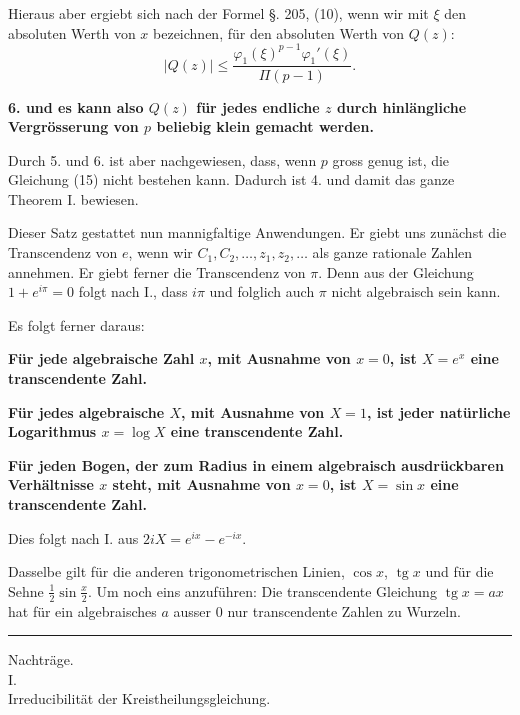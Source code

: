 \documentclass[11pt]{article}
\newcommand{\abs}[1]{\left|#1\right|}
\newcommand{\tg}{\operatorname{tg}}
\begin{document}
Hieraus aber ergiebt sich nach der Formel §. 205, (10), wenn wir mit $\xi$ den absoluten Werth von $x$ bezeichnen, für den absoluten Werth von $Q(z)$:
\[
\abs{Q(z)}\leq \frac{\varphi_1(\xi)^{p-1}\varphi_1'(\xi)}{\Pi(p-1)}.
\]

\textbf{6. und es kann also $Q(z)$ für jedes endliche $z$ durch hinlängliche Vergrösserung von $p$ beliebig klein gemacht werden.}

Durch 5. und 6. ist aber nachgewiesen, dass, wenn $p$ gross genug ist, die Gleichung (15) nicht bestehen kann. Dadurch ist 4. und damit das ganze Theorem I. bewiesen.

Dieser Satz gestattet nun mannigfaltige Anwendungen. Er giebt uns zunächst die Transcendenz von $e$, wenn wir $C_1,C_2,\ldots,z_1,z_2,\ldots$ als ganze rationale Zahlen annehmen. Er giebt ferner die Transcendenz von $\pi$. Denn aus der Gleichung $1+e^{i\pi}=0$ folgt nach I., dass $i\pi$ und folglich auch $\pi$ nicht algebraisch sein kann.

Es folgt ferner daraus:

\begin{center}
\textbf{Für jede algebraische Zahl $x$, mit Ausnahme von $x=0$, ist $X=e^x$ eine transcendente Zahl.}

\textbf{Für jedes algebraische $X$, mit Ausnahme von $X=1$, ist jeder natürliche Logarithmus $x=\log X$ eine transcendente Zahl.}

\textbf{Für jeden Bogen, der zum Radius in einem algebraisch ausdrückbaren Verhältnisse $x$ steht, mit Ausnahme von $x=0$, ist $X=\sin x$ eine transcendente Zahl.}
\end{center}

Dies folgt nach I. aus $2iX=e^{ix}-e^{-ix}$.

Dasselbe gilt für die anderen trigonometrischen Linien, $\cos x$, $\tg x$ und für die Sehne $\frac12\sin\frac{x}{2}$. Um noch eins anzuführen: Die transcendente Gleichung $\tg x=ax$ hat für ein algebraisches $a$ ausser 0 nur transcendente Zahlen zu Wurzeln.

\bigskip
\begin{center}\rule{0.28\linewidth}{0.4pt}\end{center}

\clearpage
\begin{center}
{\Large Nachträge.}\\[1em]
{\large I.}\\[0.5em]
{\large Irreducibilität der Kreistheilungsgleichung.}
\end{center}
\end{document}

